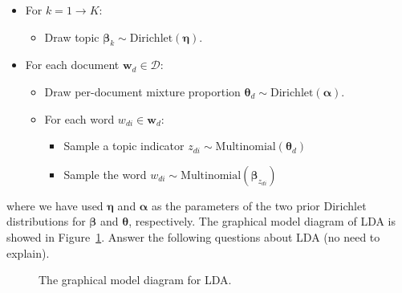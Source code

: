 \documentclass[10pt]{article}
\begin{document}
\begin{itemize}
\item For $k = 1 \rightarrow K$:
\begin{itemize}
    \item Draw topic $\bm{\beta}_{k} \sim \mbox{Dirichlet}(\bm{\eta})$.
\end{itemize}
\item For each document $\bm{w}_d \in \mathcal{D}$:
\begin{itemize}
    \item Draw per-document mixture proportion $\bm{\theta}_d \sim \mbox{Dirichlet}(\bm{\alpha})$.
    \item For each word $w_{di} \in \bm{w}_d$:
    \begin{itemize}
        \item Sample a topic indicator $z_{di} \sim \mbox{Multinomial}(\bm{\theta}_d)$
        \item Sample the word $w_{di} \sim \mbox{Multinomial}(\bm{\beta}_{z_{di}})$
    \end{itemize}
\end{itemize}
\end{itemize}
where we have used $\bm{\eta}$ and $\bm{\alpha}$ as the parameters of the two prior Dirichlet distributions for $\bm{\beta}$ and $\bm{\theta}$, respectively. The graphical model diagram of LDA is showed in Figure~\ref{fig:lda}. Answer the following questions about LDA (no need to explain).

\begin{figure}[!ht]
\centering
{}
\caption{The graphical model diagram for LDA.}
\label{fig:lda}
\end{figure}
\end{document}
